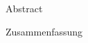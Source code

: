 \begin{polyabstract}{Abstract} 
	
\end{polyabstract}

\pagebreak
\begin{polyabstract}{Zusammenfassung}

\end{polyabstract}
